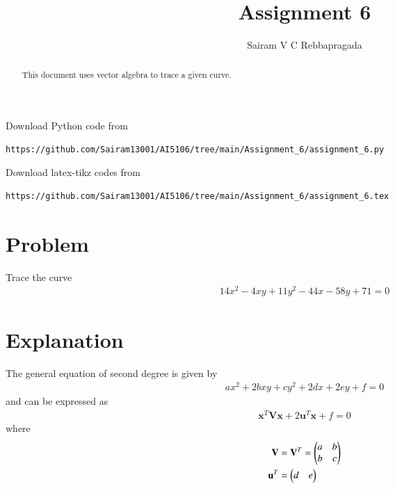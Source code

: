 \documentclass[journal,12pt,twocolumn]{IEEEtran}
\begin{document}
\makeatletter
{}
\makeatother
\let\StandardTheFigure\thefigure
\let\vec\mathbf
\renewcommand{\thefigure}{\theproblem}
\def\putbox#1#2#3{\makebox[0in][l]{\makebox[#1][l]{}\raisebox{\baselineskip}[0in][0in]{\raisebox{#2}[0in][0in]{#3}}}}
     \def\rightbox#1{\makebox[0in][r]{#1}}
     \def\centbox#1{\makebox[0in]{#1}}
     \def\topbox#1{\raisebox{-\baselineskip}[0in][0in]{#1}}
     \def\midbox#1{\raisebox{-0.5\baselineskip}[0in][0in]{#1}}
\vspace{3cm}
\title{Assignment 6}
\author{Sairam V C Rebbapragada}
\maketitle
\newpage
\bigskip
\renewcommand{\thefigure}{\theenumi}
\renewcommand{\thetable}{\theenumi}
\begin{abstract}
This document uses vector algebra to trace a given curve.
\end{abstract}
Download Python code from 
%
\begin{lstlisting}
https://github.com/Sairam13001/AI5106/tree/main/Assignment_6/assignment_6.py
\end{lstlisting}
%
Download latex-tikz codes from 
%
\begin{lstlisting}
https://github.com/Sairam13001/AI5106/tree/main/Assignment_6/assignment_6.tex
\end{lstlisting}
%

\section{Problem}
Trace the curve
\begin{align}
14x^2 - 4xy + 11y^2 - 44x - 58y + 71 =0  \label{given_curve_eq}
\end{align}

\section{Explanation}

The general equation of second degree is given by
\begin{align}
ax^2+2bxy+cy^2+2dx+2ey+f=0 \label{gen_quad_eqn}
\end{align}
and can be expressed as
\begin{align}
\vec{x}^T\vec{V}\vec{x}+2\vec{u}^T\vec{x}+f=0 \label{conic_quad_eqn}
\end{align}
where
\begin{align}
\vec{V} &= \vec{V}^T = \myvec{a & b \\ b & c}
\\
\vec{u}^T &= \myvec{d & e}
\end{align}
\end{document}
